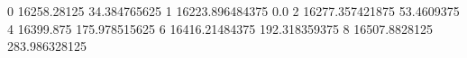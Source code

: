 0 16258.28125 34.384765625
1 16223.896484375 0.0
2 16277.357421875 53.4609375
4 16399.875 175.978515625
6 16416.21484375 192.318359375
8 16507.8828125 283.986328125
